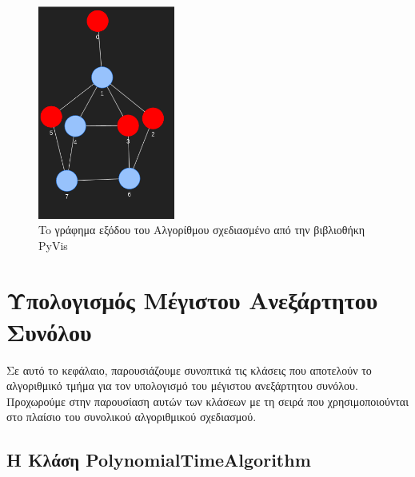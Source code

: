 

\begin{figure}[H]
	\centering
	\includegraphics[width=0.4\textwidth]{pictures/at-free-graph-ind-output-pyvis.png} 
	\caption{To γράφημα εξόδου του Αλγορίθμου σχεδιασμένο από την βιβλιοθήκη PyVis}
	\label{fig:at-free-graph-ind-output-pyvis}
\end{figure}


\section{Υπολογισμός Μέγιστου Ανεξάρτητου Συνόλου}
\label{sec:Impl-Independent-set}


Σε αυτό το κεφάλαιο, παρουσιάζουμε συνοπτικά τις κλάσεις που αποτελούν το αλγοριθμικό τμήμα για τον υπολογισμό του μέγιστου ανεξάρτητου συνόλου. Προχωρούμε στην παρουσίαση αυτών των κλάσεων με τη σειρά που χρησιμοποιούνται στο πλαίσιο του συνολικού αλγοριθμικού σχεδιασμού. 



\subsection{H Kλάση PolynomialTimeAlgorithm}





